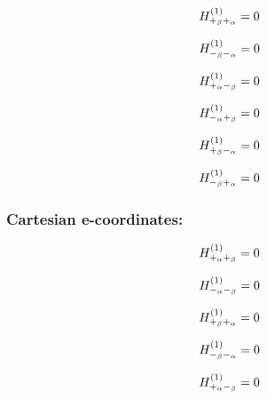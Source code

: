 \documentclass[fleqn]{article}
\begin{document}
\begin{dmath*}
H_{+_{\beta}+_{\alpha}}^{(1)}=0\\
\end{dmath*}

\begin{dmath*}
H_{-_{\beta}-_{\alpha}}^{(1)}=0\\
\end{dmath*}

\begin{dmath*}
H_{+_{\alpha}-_{\beta}}^{(1)}=0\\
\end{dmath*}

\begin{dmath*}
H_{-_{\alpha}+_{\beta}}^{(1)}=0\\
\end{dmath*}

\begin{dmath*}
H_{+_{\beta}-_{\alpha}}^{(1)}=0\\
\end{dmath*}

\begin{dmath*}
H_{-_{\beta}+_{\alpha}}^{(1)}=0\\
\end{dmath*}
\subsubsection*{Cartesian e-coordinates:}

\begin{dmath*}
H_{+_{\alpha}+_{\beta}}^{(1)}=0\\
\end{dmath*}

\begin{dmath*}
H_{-_{\alpha}-_{\beta}}^{(1)}=0\\
\end{dmath*}

\begin{dmath*}
H_{+_{\beta}+_{\alpha}}^{(1)}=0\\
\end{dmath*}

\begin{dmath*}
H_{-_{\beta}-_{\alpha}}^{(1)}=0\\
\end{dmath*}

\begin{dmath*}
H_{+_{\alpha}-_{\beta}}^{(1)}=0\\
\end{dmath*}
\end{document}
